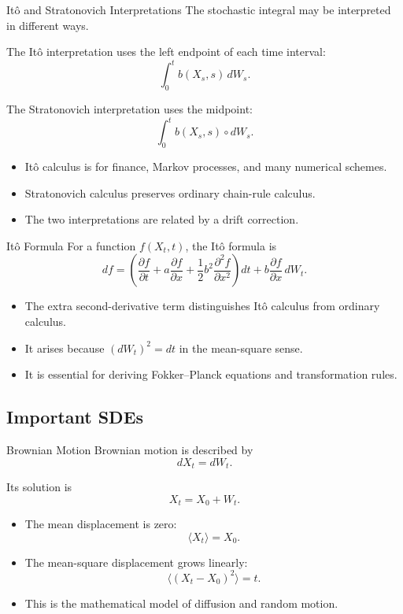 \documentclass[a4paper, 10pt, onepage]{elegantbook}
\begin{document}
{\begin{frame}{Itô and Stratonovich Interpretations}
  The stochastic integral may be interpreted in different ways.

  The Itô interpretation uses the left endpoint of each time interval:
  \[
    \int_0^t b(X_s,s)\,dW_s.
  \]

  The Stratonovich interpretation uses the midpoint:
  \[
    \int_0^t b(X_s,s)\circ dW_s.
  \]

  \begin{itemize}
    \item Itô calculus is  for finance, Markov processes, and many numerical schemes.
    \item Stratonovich calculus preserves ordinary chain-rule calculus.
    \item The two interpretations are related by a drift correction.
  \end{itemize}
\end{frame}

\begin{frame}{Itô Formula}
  For a function \(f(X_t,t)\), the Itô formula is
  \[
    df
    =
    \left(
      \frac{\partial f}{\partial t}
      +
      a\frac{\partial f}{\partial x}
      +
      \frac{1}{2}b^2
      \frac{\partial^2 f}{\partial x^2}
    \right)dt
    +
    b\frac{\partial f}{\partial x}\,dW_t.
  \]

  \begin{itemize}
    \item The extra second-derivative term distinguishes Itô calculus from ordinary calculus.
    \item It arises because \((dW_t)^2=dt\) in the mean-square sense.
    \item It is essential for deriving Fokker--Planck equations and transformation rules.
  \end{itemize}
\end{frame}

\subsection{Important SDEs}

\begin{frame}{Brownian Motion}
  Brownian motion is described by
  \[
    dX_t=dW_t.
  \]

  Its solution is
  \[
    X_t=X_0+W_t.
  \]

  \begin{itemize}
    \item The mean displacement is zero:
    \[
      \langle X_t\rangle=X_0.
    \]
    \item The mean-square displacement grows linearly:
    \[
      \langle(X_t-X_0)^2\rangle=t.
    \]
    \item This is the mathematical model of diffusion and random motion.
  \end{itemize}
\end{frame}

}
\end{document}
